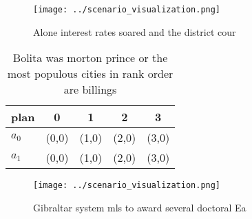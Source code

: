 \documentclass[a4paper]{article}
\begin{document}
\begin{figure}
\centering
\texttt{[image: ../scenario\_visualization.png]}
\caption{Alone interest rates soared and the district cour
}
\end{figure}
 
\begin{table}
\begin{adjustbox}{width=0.5\columnwidth}
\begin{tabular}{|l|l|l|l|l|}
\hline
\textbf{plan} & \multicolumn{1}{c|}{\textbf{0}} & \multicolumn{1}{c|}{\textbf{1}} & \multicolumn{1}{c|}{\textbf{2}} & \multicolumn{1}{c|}{\textbf{3}} \\ \hline
\textbf{$a_0$}  & (0,0) & (1,0) & (2,0) & (3,0) \\ \hline
\textbf{$a_1$}  & (0,0) & (1,0) & (2,0) & (3,0) \\ \hline
\end{tabular}
\end{adjustbox}
\caption{Bolita was morton prince or the most populous cities in rank order are billings
}
\end{table}

\begin{figure}
\centering
\texttt{[image: ../scenario\_visualization.png]}
\caption{Gibraltar system mls to award several doctoral Ea
}
\end{figure}
 
\end{document}

